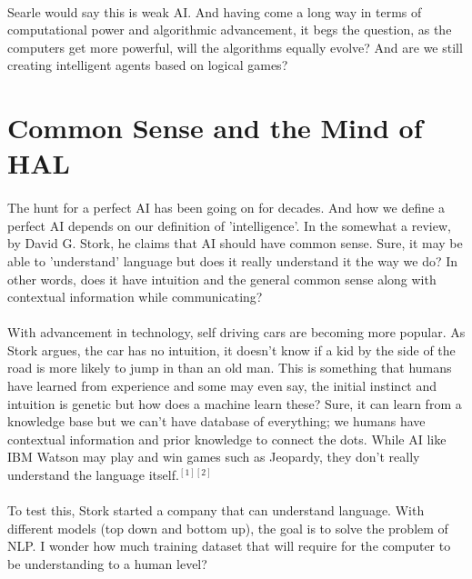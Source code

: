 \documentclass[10pt]{article}
\begin{document}
  \paragraph{}\indent
  Searle would say this is weak AI. And having come a long way in terms of computational power and algorithmic advancement, it begs the question, as the computers get more powerful, will the algorithms equally evolve? And are we still creating intelligent agents based on logical games?


  \section{Common Sense and the Mind of HAL}
  \paragraph{} \indent
  The hunt for a perfect AI has been going on for decades. And how we define a perfect AI depends on our definition of 'intelligence'. In the somewhat a review, by David G. Stork, he claims that AI should have common sense. Sure, it may be able to 'understand' language but does it really understand it the way we do? In other words, does it have intuition and the general common sense along with contextual information while communicating? 
  \paragraph{}\indent
  With advancement in technology, self driving cars are becoming more popular. As Stork argues, the car has no intuition, it doesn't know if a kid by the side of the road is more likely to jump in than an old man. This is something that humans have learned from experience and some may even say, the initial instinct and intuition is genetic but how does a machine learn these? Sure, it can learn from a knowledge base but we can't have database of everything; we humans have contextual information and prior knowledge to connect the dots. While AI like IBM Watson may play and win games such as Jeopardy, they don't really understand the language itself.$^{[1][2]}$  
  \paragraph{}\indent
  To test this, Stork started a company that can understand language. With different models (top down and bottom up), the goal is to solve the problem of NLP. I wonder how much training dataset that will require for the computer to be understanding to a human level?
\end{document}
